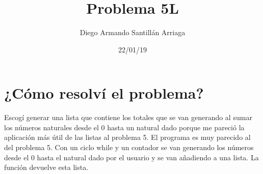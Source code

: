 \documentclass[letterpaper, 12pt, oneside]{article}%
\title{\Huge Problema 5L}
\author{Diego Armando Santillán Arriaga}
\date{22/01/19}
\begin{document}
\maketitle
\newpage
\section*{¿Cómo resolví el problema?}
Escogí generar una lista que contiene los totales que se van generando al sumar los números naturales desde el 0 hasta un natural dado porque me pareció la aplicación más útil de las listas al problema 5.
El programa es muy parecido al del problema 5. Con un ciclo while y un contador se van generando los números desde el 0 hasta el natural dado por el usuario y se van añadiendo a una lista. La función devuelve esta lista. 
\end{document}
